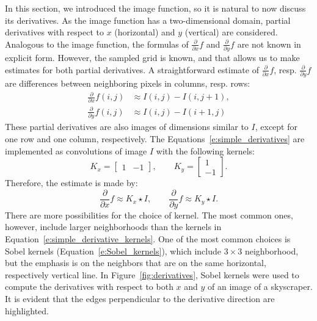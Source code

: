 In this section, we introduced the image function, so it is natural to now discuss its derivatives.
As the image function has a two-dimensional domain, partial derivatives with respect to $x$ (horizontal) and $y$ (vertical) are considered.
Analogous to the image function, the formulas of $\frac{\partial}{\partial x}f$ and $\frac{\partial}{\partial y}f$ are not known in explicit form.
However, the sampled grid is known, and that allows us to make estimates for both partial derivatives.
A straightforward estimate of $\frac{\partial}{\partial x}f$, resp. $\frac{\partial}{\partial y}f$ are differences between neighboring pixels in columns, resp. rows:
\begin{equation}
\begin{aligned}
    \frac{\partial}{\partial x}f(i,j) &\approx I(i,j) - I(i,j+1), \\
    \frac{\partial}{\partial y}f(i,j) &\approx I(i,j) - I(i+1,j)
\end{aligned}
\label{e:simple_derivatives}
\end{equation}
These partial derivatives are also images of dimensions similar to $I$, except for one row and one column, respectively.
The Equations~\eqref{e:simple_derivatives} are implemented as convolutions of image $I$ with the following kernels:
\begin{equation}
K_x = \begin{bmatrix}1 & -1\end{bmatrix}, \qquad K_y = \begin{bmatrix}1 \\ -1\end{bmatrix}.
\label{e:simple_derivative_kernels}
\end{equation}
Therefore, the estimate is made by:
\begin{equation}
    \frac{\partial}{\partial x}f \approx K_x \star I, \qquad
    \frac{\partial}{\partial y}f \approx K_y \star I.
    \label{e:trivial_derivative_kernels}
\end{equation}
There are more possibilities for the choice of kernel.
The most common ones, however, include larger neighborhoods than the kernels in Equation~\eqref{e:simple_derivative_kernels}.
One of the most common choices is Sobel kernels (Equation~\eqref{e:Sobel_kernels}), which include $3\times3$ neighborhood, but the emphasis is on the neighbors that are on the same horizontal, respectively vertical line.
In Figure~\ref{fig:derivatives}, Sobel kernels were used to compute the derivatives with respect to both $x$ and $y$ of an image of a skyscraper.
It is evident that the edges perpendicular to the derivative direction are highlighted.

